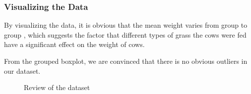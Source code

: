 \documentclass[a4paper,11pt,onecolumn,twoside]{article}
\begin{document}
\subsubsection{Visualizing the Data}
By visualizing the data, it is obvious that the mean weight varies from group to group , which suggests the factor that different types of grass the cows were fed have a significant effect on the weight of cows.\par
From the grouped boxplot, we are convinced that there is no obvious outliers in our dataset.
\begin{figure}[H]
	\centering
	\caption{Review of the dataset}
\end{figure}
\end{document}
